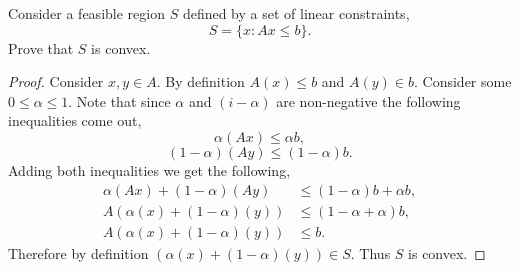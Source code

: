 \documentclass[12pt]{article}
\makeatletter
\theoremstyle{homework}
\newenvironment{exercise}[1]
{\def\@currentlabel{#1}\exercisecore}
{\endexercisecore}
\makeatother
\begin{document}
\begin{exercise}{3.3} Consider a feasible region $S$ defined by a set of linear constraints, 
  \begin{equation*}
    S = \{x: Ax \leq b\}. 
  \end{equation*}
  Prove that $S$ is convex. 
    \begin{proof} Consider $x, y \in A$. By definition $A(x) \leq b$ and $A(y) \in b$. Consider some $0 \leq \alpha \leq 1$. 
      Note that since $\alpha$ and $(i - \alpha)$ are non-negative the following inequalities come out, 
      \begin{equation*}
        \alpha(Ax) \leq \alpha b,  
      \end{equation*}
      \begin{equation*}
        (1 - \alpha)(Ay) \leq (1 - \alpha) b.  
      \end{equation*}
      Adding both inequalities we get the following, 
      \begin{align*}
        \alpha(Ax) +  (1 - \alpha)(Ay) &\leq (1 - \alpha) b + \alpha b, \\
        A(\alpha(x) +  (1 - \alpha)(y)) &\leq (1 - \alpha + \alpha) b,  \\
        A(\alpha(x) +  (1 - \alpha)(y)) &\leq b.
      \end{align*}
      Therefore by definition $(\alpha(x) +  (1 - \alpha)(y)) \in S$. Thus $S$ is convex. 
    \end{proof}
\end{exercise}
\vspace{.5in}
\end{document}
